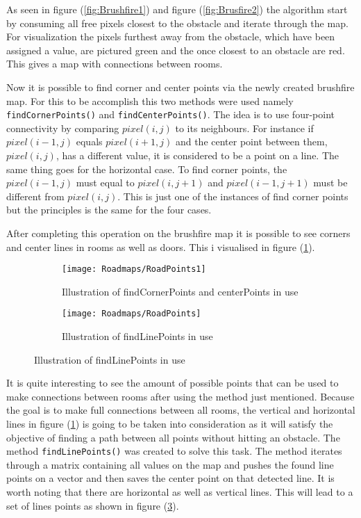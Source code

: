 \documentclass[../Head/Main.tex]{subfiles}
\begin{document}
As seen in figure (\ref{fig:Brushfire1}) and figure (\ref{fig:Brusfire2}) the algorithm start by consuming all free pixels closest to the obstacle and iterate through the map. For visualization the pixels furthest away from the obstacle, which have been assigned a value, are pictured green and the once closest to an obstacle are red. This gives a map with connections between rooms. 
  
Now it is possible to find corner and center points via the newly created brushfire map. For this to be accomplish this two methods were used namely \texttt{findCornerPoints()} and \texttt{findCenterPoints()}. The idea is to use four-point connectivity by comparing $pixel(i,j)$ to its neighbours. For instance if $pixel(i-1,j)$ equals $pixel(i+1,j)$ and the center point between them, $pixel(i,j)$, has a different value, it is considered to be a point on a line. The same thing goes for the horizontal case. To find corner points, the $pixel(i-1,j)$ must equal to $pixel(i,j+1)$ and $pixel(i-1,j+1)$ must be different from $pixel(i,j)$. This is just one of the instances of find corner points but the principles is the same for the four cases.           

After completing this operation on the brushfire map it is possible to see corners and center lines in rooms as well as doors. This i visualised in figure (\ref{fig:CornersAndCentersOfRoom}).
  
  \begin{figure}[H]
   \begin{subfigure}[b]{0.49\textwidth}
    \centering
    \texttt{[image: Roadmaps/RoadPoints1]}
    \caption{Illustration of findCornerPoints and centerPoints in use}
    \label{fig:CornersAndCentersOfRoom}
  \end{subfigure}
  \hfill
   \begin{subfigure}[b]{0.49\textwidth}
    \centering
    \texttt{[image: Roadmaps/RoadPoints]}
    \caption{Illustration of findLinePoints in use}
    \label{fig:LinePoints}
  \end{subfigure}
  \end{figure}

It is quite interesting to see the amount of possible points that can be used to make connections between rooms after using the method just mentioned. Because the goal is to make full connections between all rooms, the vertical and horizontal lines in figure (\ref{fig:CornersAndCentersOfRoom}) is going to be taken into consideration as it will satisfy the objective of finding a path between all points without hitting an obstacle. The method \texttt{findLinePoints()} was created to solve this task. The method iterates through a matrix containing all values on the map and pushes the found line points on a vector and then saves the center point on that detected line. It is worth noting that there are horizontal as well as vertical lines. This will lead to a set of lines points as shown in figure (\ref{fig:LinePoints}). 
\end{document}
